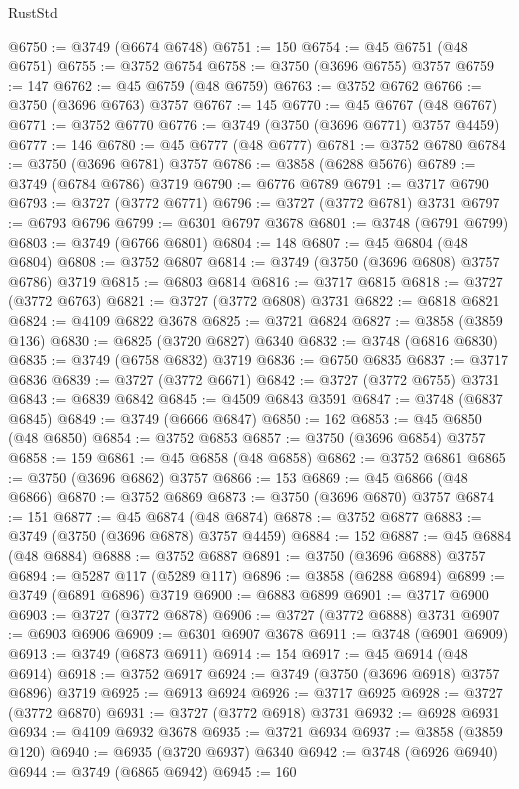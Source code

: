 \begin{lexlean}{RustStd}
\begin{coremodule}
@6750 := @3749 (@6674 @6748)
@6751 := 150
@6754 := @45 @6751 (@48 @6751)
@6755 := @3752 @6754
@6758 := @3750 (@3696 @6755) @3757
@6759 := 147
@6762 := @45 @6759 (@48 @6759)
@6763 := @3752 @6762
@6766 := @3750 (@3696 @6763) @3757
@6767 := 145
@6770 := @45 @6767 (@48 @6767)
@6771 := @3752 @6770
@6776 := @3749 (@3750 (@3696 @6771) @3757 @4459)
@6777 := 146
@6780 := @45 @6777 (@48 @6777)
@6781 := @3752 @6780
@6784 := @3750 (@3696 @6781) @3757
@6786 := @3858 (@6288 @5676)
@6789 := @3749 (@6784 @6786) @3719
@6790 := @6776 @6789
@6791 := @3717 @6790
@6793 := @3727 (@3772 @6771)
@6796 := @3727 (@3772 @6781) @3731
@6797 := @6793 @6796
@6799 := @6301 @6797 @3678
@6801 := @3748 (@6791 @6799)
@6803 := @3749 (@6766 @6801)
@6804 := 148
@6807 := @45 @6804 (@48 @6804)
@6808 := @3752 @6807
@6814 := @3749 (@3750 (@3696 @6808) @3757 @6786) @3719
@6815 := @6803 @6814
@6816 := @3717 @6815
@6818 := @3727 (@3772 @6763)
@6821 := @3727 (@3772 @6808) @3731
@6822 := @6818 @6821
@6824 := @4109 @6822 @3678
@6825 := @3721 @6824
@6827 := @3858 (@3859 @136)
@6830 := @6825 (@3720 @6827) @6340
@6832 := @3748 (@6816 @6830)
@6835 := @3749 (@6758 @6832) @3719
@6836 := @6750 @6835
@6837 := @3717 @6836
@6839 := @3727 (@3772 @6671)
@6842 := @3727 (@3772 @6755) @3731
@6843 := @6839 @6842
@6845 := @4509 @6843 @3591
@6847 := @3748 (@6837 @6845)
@6849 := @3749 (@6666 @6847)
@6850 := 162
@6853 := @45 @6850 (@48 @6850)
@6854 := @3752 @6853
@6857 := @3750 (@3696 @6854) @3757
@6858 := 159
@6861 := @45 @6858 (@48 @6858)
@6862 := @3752 @6861
@6865 := @3750 (@3696 @6862) @3757
@6866 := 153
@6869 := @45 @6866 (@48 @6866)
@6870 := @3752 @6869
@6873 := @3750 (@3696 @6870) @3757
@6874 := 151
@6877 := @45 @6874 (@48 @6874)
@6878 := @3752 @6877
@6883 := @3749 (@3750 (@3696 @6878) @3757 @4459)
@6884 := 152
@6887 := @45 @6884 (@48 @6884)
@6888 := @3752 @6887
@6891 := @3750 (@3696 @6888) @3757
@6894 := @5287 @117 (@5289 @117)
@6896 := @3858 (@6288 @6894)
@6899 := @3749 (@6891 @6896) @3719
@6900 := @6883 @6899
@6901 := @3717 @6900
@6903 := @3727 (@3772 @6878)
@6906 := @3727 (@3772 @6888) @3731
@6907 := @6903 @6906
@6909 := @6301 @6907 @3678
@6911 := @3748 (@6901 @6909)
@6913 := @3749 (@6873 @6911)
@6914 := 154
@6917 := @45 @6914 (@48 @6914)
@6918 := @3752 @6917
@6924 := @3749 (@3750 (@3696 @6918) @3757 @6896) @3719
@6925 := @6913 @6924
@6926 := @3717 @6925
@6928 := @3727 (@3772 @6870)
@6931 := @3727 (@3772 @6918) @3731
@6932 := @6928 @6931
@6934 := @4109 @6932 @3678
@6935 := @3721 @6934
@6937 := @3858 (@3859 @120)
@6940 := @6935 (@3720 @6937) @6340
@6942 := @3748 (@6926 @6940)
@6944 := @3749 (@6865 @6942)
@6945 := 160

\end{coremodule}
\end{lexlean}
